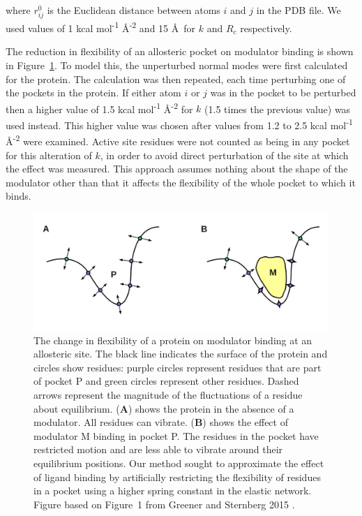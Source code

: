 where $r_{ij}^{0}$ is the Euclidean distance between atoms $i$ and $j$ in the PDB file.
We used values of 1 kcal mol\textsuperscript{-1} \AA\textsuperscript{-2} and 15 \AA\ for $k$ and $R_{c}$ respectively.

The reduction in flexibility of an allosteric pocket on modulator binding is shown in Figure~\ref{fig:ligand_binding}.
To model this, the unperturbed normal modes were first calculated for the protein.
The calculation was then repeated, each time perturbing one of the pockets in the protein.
If either atom $i$ or $j$ was in the pocket to be perturbed then a higher value of 1.5 kcal mol\textsuperscript{-1} \AA\textsuperscript{-2} for $k$ (1.5 times the previous value) was used instead.
This higher value was chosen after values from 1.2 to 2.5 kcal mol\textsuperscript{-1} \AA\textsuperscript{-2} were examined.
Active site residues were not counted as being in any pocket for this alteration of $k$, in order to avoid direct perturbation of the site at which the effect was measured.
This approach assumes nothing about the shape of the modulator other than that it affects the flexibility of the whole pocket to which it binds.


\begin{figure}
\centering

\includegraphics[width=\textwidth]{figures/ligand_binding/ligand_binding}

\caption{The change in flexibility of a protein on modulator binding at an allosteric site.
The black line indicates the surface of the protein and circles show residues: purple circles represent residues that are part of pocket P and green circles represent other residues.
Dashed arrows represent the magnitude of the fluctuations of a residue about equilibrium.
(\textbf{A}) shows the protein in the absence of a modulator.
All residues can vibrate.
(\textbf{B}) shows the effect of modulator M binding in pocket P.
The residues in the pocket have restricted motion and are less able to vibrate around their equilibrium positions.
Our method sought to approximate the effect of ligand binding by artificially restricting the flexibility of residues in a pocket using a higher spring constant in the elastic network.
Figure based on Figure~1 from Greener and Sternberg 2015 \cite{Greener2015}.}

\label{fig:ligand_binding}
\end{figure}


